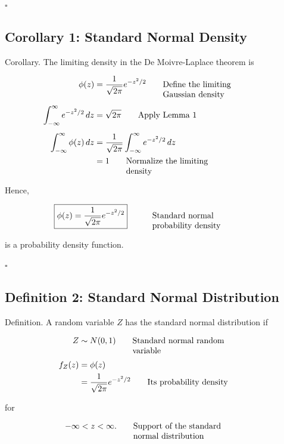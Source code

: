 \documentclass{article}
\newcommand{\justwidth}{0.36\textwidth}
\newcommand{\just}[1]{\parbox[t]{\justwidth}{\raggedright #1}}
\newlength{\defaultparwidth}
\newcommand{\defaultwidthpar}[1]{%
  \par
  \noindent\hfill
  \begin{minipage}{\defaultparwidth}%
  #1%
  \end{minipage}%
  \hfill\null
  \par
}
\begin{document}
$\square$

\subsection{Corollary 1: Standard Normal Density}
Corollary. The limiting density in the De Moivre-Laplace theorem is

\begin{align*}
\phi(z)
&=
\frac{1}{\sqrt{2\pi}}
e^{-z^2/2}
\tag*{\just{Define the limiting Gaussian density}}
\\[0.45em]
\int_{-\infty}^{\infty}
e^{-z^2/2}\,dz
&=
\sqrt{2\pi}
\tag*{\just{Apply Lemma 1}}
\\[0.45em]
\int_{-\infty}^{\infty}
\phi(z)\,dz
&=
\frac{1}{\sqrt{2\pi}}
\int_{-\infty}^{\infty}
e^{-z^2/2}\,dz
\\
&=
1
\tag*{\just{Normalize the limiting density}}
\end{align*}

Hence,

\begin{align*}
\boxed{
\phi(z)
=
\frac{1}{\sqrt{2\pi}}
e^{-z^2/2}
}
&&
\tag*{\just{Standard normal probability density}}
\end{align*}

\defaultwidthpar{is a probability density function.}

$\square$

\subsection{Definition 2: Standard Normal Distribution}
Definition. A random variable $Z$ has the standard normal distribution if

\begin{align*}
Z
&\sim
N(0,1)
\tag*{\just{Standard normal random variable}}
\\[0.45em]
f_Z(z)
&=
\phi(z)
\\
&=
\frac{1}{\sqrt{2\pi}}
e^{-z^2/2}
\tag*{\just{Its probability density}}
\end{align*}

for

\begin{align*}
-\infty
&<
z
<
\infty.
\tag*{\just{Support of the standard normal distribution}}
\end{align*}

\end{document}
